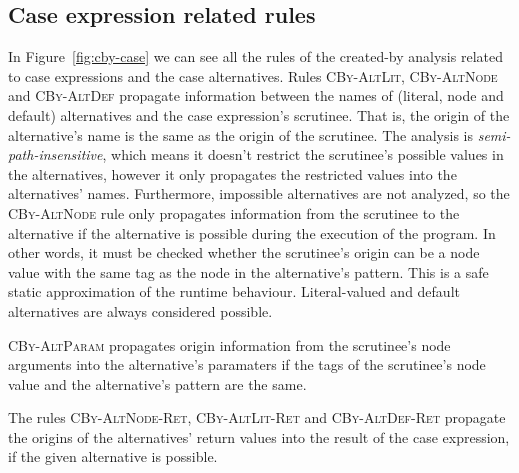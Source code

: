 \documentclass[main.tex]{subfiles}
\begin{document}
	\subsection{Case expression related rules} \label{subsec:cby-case}
	
	In Figure~\ref{fig:cby-case} we can see all the rules of the created-by analysis related to case expressions and the case alternatives. Rules \textsc{CBy-AltLit}, \textsc{CBy-AltNode} and \textsc{CBy-AltDef} propagate information between the names of (literal, node and default) alternatives and the case expression's scrutinee. That is, the origin of the alternative's name is the same as the origin of the scrutinee. The analysis is \emph{semi-path-insensitive}, which means it doesn't restrict the scrutinee's possible values in the alternatives, however it only propagates the restricted values into the alternatives' names. Furthermore, impossible alternatives are not analyzed, so the \textsc{CBy-AltNode} rule only propagates information from the scrutinee to the alternative if the alternative is possible during the execution of the program. In other words, it must be checked whether the scrutinee's origin can be a node value with the same tag as the node in the alternative's pattern. This is a safe static approximation of the runtime behaviour. Literal-valued and default alternatives are always considered possible.
	
	\textsc{CBy-AltParam} propagates origin information from the scrutinee's node arguments into the alternative's paramaters if the tags of the scrutinee's node value and the alternative's pattern are the same.
	
	The rules \textsc{CBy-AltNode-Ret}, \textsc{CBy-AltLit-Ret} and \textsc{CBy-AltDef-Ret} propagate the origins of the alternatives' return values into the result of the case expression, if the given alternative is possible.
\end{document}
